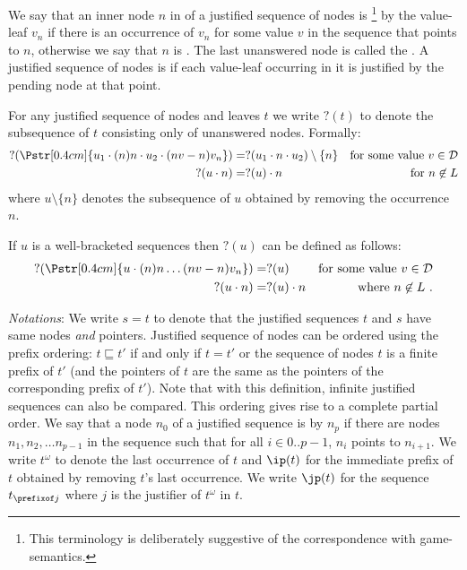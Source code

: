 We say that an inner node $n$ in of a justified sequence of nodes is
\footnote{This terminology is deliberately suggestive of the correspondence with game-semantics.} by the value-leaf $v_n$ if there is an occurrence of $v_n$ for some value $v$ in the
sequence that points to $n$, otherwise we say that $n$ is
. The last unanswered node is called the
.  A justified sequence of nodes is
 if each value-leaf occurring in it is justified by the pending node at that point.

For any justified sequence of nodes and leaves $t$ we write $?(t)$
to denote the subsequence of $t$ consisting only of unanswered
nodes. Formally:
\begin{align*}
  ?(\Pstr[0.4cm]{u_1 \cdot (n){n} \cdot u_2 \cdot (nv-n){v_n} }  ) &= ?(u_1 \cdot n \cdot u_2) \setminus \{ n \}
        & \mbox{for some value $v\in\mathcal{D}$} \\
  ?(u \cdot n)   &= ?(u)\cdot n    & \mbox{for $n\not\in L$}
\end{align*}
where $u \setminus \{ n \}$ denotes the subsequence of $u$ obtained by removing the occurrence $n$.

If $u$ is a well-bracketed sequences then $?(u)$ can be defined as follows:
\begin{align*}
  ?(\Pstr[0.4cm]{u \cdot (n){n} \ldots (nv-n){v_n} }  ) &= ?(u)
          & \mbox{for some value $v\in\mathcal{D}$}  \\
    ?(u \cdot n) &= ?(u)\cdot n    & \mbox{where $n\not\in L$} \ .
\end{align*}

\bigskip

\emph{Notations}: We write $s = t$ to denote that the justified sequences $t$ and $s$
have same nodes \emph{and} pointers. Justified sequence of nodes can
be ordered using the prefix ordering: $t \sqsubseteq t'$ if and only
if $t=t'$ or the sequence of nodes $t$ is a finite prefix of $t'$
(and the pointers of $t$ are the same as the pointers of the
corresponding prefix of $t'$). Note that with this definition,
infinite justified sequences can also be compared. This ordering
gives rise to a complete partial order.
We say that a node $n_0$ of a justified sequence is  by $n_p$ if there are nodes $n_1, n_2, \ldots n_{p-1}$ in the sequence such that for all $i\in 0..p-1$, $n_i$ points to $n_{i+1}$.
We write $t^\omega$ to denote the last occurrence of $t$ and $\ip(t)$ for the immediate prefix of $t$ obtained by removing $t$'s last occurrence. We write $\jp(t)$ for the sequence $t_{\prefixof j}$ where $j$ is the justifier of $t^\omega$ in $t$.
\smallskip


